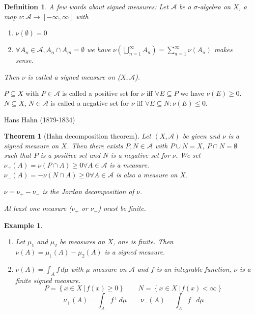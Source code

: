 \documentclass{article}
\newtheorem{theorem}{Theorem}  \numberwithin{theorem}{section}
\newtheorem{example}{Example}  \numberwithin{example}{section}
\newtheorem{definition}{Definition}  \numberwithin{definition}{section}
\newcommand{\setdef}[2]{\left\{\left.#1\,\right|\,#2\right\}}
\begin{document}
\begin{definition}
  A few words about signed measures:
  Let $\mathcal A$ be a $\sigma$-algebra on $X$, a map $\nu: \mathcal A \to [-\infty, \infty]$ with
  \begin{enumerate}
    \item $\nu(\emptyset) = 0$
    \item $\forall A_n \in \mathcal A, A_n \cap A_m = \emptyset$ we have $\nu(\bigcup_{n=1}^\infty A_n) = \sum_{n=1}^\infty \nu(A_n)$ makes sense.
  \end{enumerate}
  Then $\nu$ is called a \emph{signed measure on ($X, \mathcal A$)}.
\end{definition}

$P \subseteq X$ with $P \in \mathcal A$ is called a positive set for $\nu$ iff $\forall E \subseteq P$ we have $\nu(E) \geq 0$.
$N \subseteq X$, $N \in \mathcal A$ is called a negative set for $\nu$ iff $\forall E \subseteq N: \nu(E) \leq 0$.

Hans Hahn (1879-1834)

\begin{theorem}[Hahn decomposition theorem]
  Let $(X, \mathcal A)$ be given and $\nu$ is a signed measure on $X$.
  Then there exists $P,N \in \mathcal A$ with $P \cup N = X$, $P \cap N = \emptyset$ such that
  $P$ is a positive set and $N$ is a negative set for $\nu$.
  We set $\nu_+(A) = \nu(P \cap A) \geq 0 \forall A \in \mathcal A$ is a measure.
  $\nu_-(A) = -\nu(N \cap A) \geq 0 \forall A \in \mathcal A$ is also a measure on $X$.

  $\nu = \nu_+ - \nu_-$ is the \emph{Jordan decomposition} of $\nu$.

  At least one measure ($\nu_+$ or $\nu_-$) must be finite.
\end{theorem}

\begin{example}
  \begin{enumerate}
    \item
      Let $\mu_1$ and $\mu_2$ be measures on $X$, one is finite.
      Then $\nu(A) = \mu_1(A) - \mu_2(A)$ is a signed measure.
    \item
      $\nu(A) = \int_A f \, d\mu$ with $\mu$ measure on $\mathcal A$ and $f$ is an integrable function,
      $\nu$ is a finite signed measure.
      \[ P = \setdef{x \in X}{f(x) \geq 0} \qquad N = \setdef{x \in X}{f(x) < \infty} \]
      \[ \nu_+(A) = \int_A f^+ \, d\mu \qquad \nu_-(A) = \int_A f^- \, d\mu \]
  \end{enumerate}
\end{example}
\end{document}
